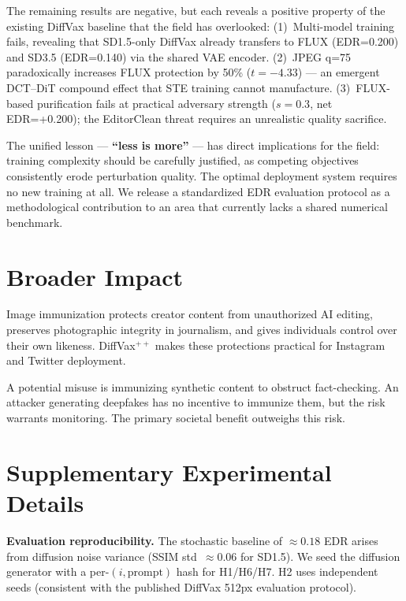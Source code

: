 \documentclass{article}
\newcommand{\diffvaxpp}{DiffVax$^{++}$\xspace}
\begin{document}
The remaining results are negative, but each reveals a positive property of the existing
DiffVax baseline that the field has overlooked:
(1)~Multi-model training fails, revealing that SD1.5-only DiffVax already transfers to FLUX
(EDR=0.200) and SD3.5 (EDR=0.140) via the shared VAE encoder.
(2)~JPEG q=75 paradoxically increases FLUX protection by 50\% ($t=-4.33$) ---
an emergent DCT--DiT compound effect that STE training cannot manufacture.
(3)~FLUX-based purification fails at practical adversary strength
($s=0.3$, net EDR=+0.200); the EditorClean threat requires an unrealistic
quality sacrifice.

The unified lesson --- \textbf{``less is more''} --- has direct implications for the
field: training complexity should be carefully justified, as competing objectives
consistently erode perturbation quality. The optimal deployment system requires no
new training at all. We release a standardized EDR evaluation protocol as a
methodological contribution to an area that currently lacks a shared numerical benchmark.

\section*{Broader Impact}

Image immunization protects creator content from unauthorized AI editing,
preserves photographic integrity in journalism, and gives individuals control over
their own likeness. \diffvaxpp makes these protections practical for Instagram
and Twitter deployment.

A potential misuse is immunizing synthetic content to obstruct fact-checking.
An attacker generating deepfakes has no incentive to immunize them, but the risk
warrants monitoring. The primary societal benefit outweighs this risk.




\appendix

\section{Supplementary Experimental Details}
\label{app:details}

\textbf{Evaluation reproducibility.} The stochastic baseline of ${\approx}0.18$ EDR
arises from diffusion noise variance (SSIM std~$\approx0.06$ for SD1.5). We seed
the diffusion generator with a per-$(i,\text{prompt})$ hash for H1/H6/H7. H2 uses
independent seeds (consistent with the published DiffVax 512px evaluation protocol).
\end{document}
